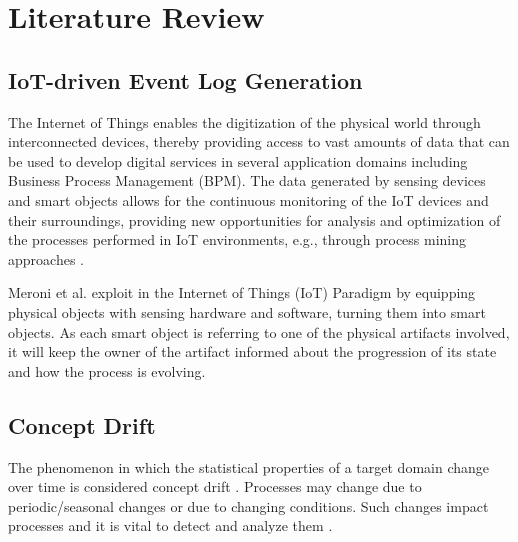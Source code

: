 \section{Literature Review}

\begin{multicols}{2}

\subsection{IoT-driven Event Log Generation}
The Internet of Things enables the digitization of the physical world through interconnected devices, thereby providing access to vast amounts of data that can be used to develop digital services in several application domains including Business Process Management (BPM). The data generated by sensing devices and smart objects allows for the continuous monitoring of the IoT devices and their surroundings, providing new opportunities for analysis and optimization of the processes performed in IoT environments, e.g., through process mining approaches \cite{seiger_towards_2020}.

Meroni et al. exploit in \cite{meroni_multi-party_2018} the Internet of Things (IoT) Paradigm by equipping physical objects with sensing hardware and software, turning them into smart objects. %
As each smart object is referring to one of the physical artifacts involved, it will keep the owner of the artifact informed about the progression of its state and how the process is evolving.


\subsection{Concept Drift}
The phenomenon in which the statistical properties of a target domain change over time is considered concept drift \cite{desai_issue_2021}.
Processes may change due to periodic/seasonal changes or due to changing conditions. Such changes impact processes and it is vital to detect and analyze them \cite{van_der_aalst_conformance_2016}.


\end{multicols}

